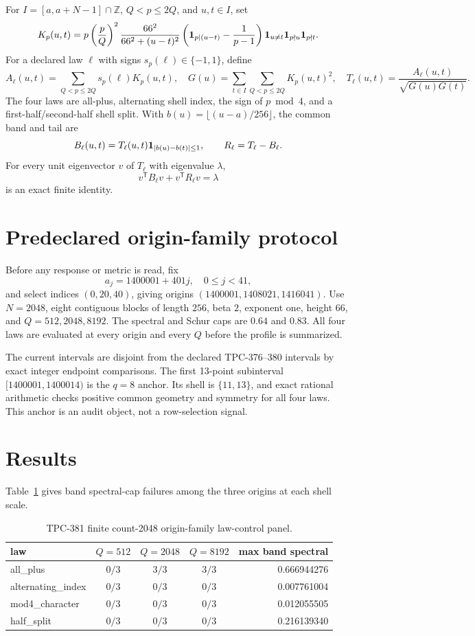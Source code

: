 \documentclass[10pt]{article}
\begin{document}
For $I=[a,a+N-1]\cap\mathbb Z$, $Q<p\leq2Q$, and $u,t\in I$, set
\[
 K_p(u,t)=p\left(\frac pQ\right)^2
 \frac{66^2}{66^2+(u-t)^2}
 \left({\bf1}_{p\mid(u-t)}-\frac1{p-1}\right)
 {\bf1}_{u\ne t}{\bf1}_{p\nmid u}{\bf1}_{p\nmid t}.
\]
For a declared law $\ell$ with signs $s_p(\ell)\in\{-1,1\}$, define
\[
 A_\ell(u,t)=\sum_{Q<p\leq2Q}s_p(\ell)K_p(u,t),\quad
 G(u)=\sum_{t\in I}\sum_{Q<p\leq2Q}K_p(u,t)^2,
 \quad T_\ell(u,t)=\frac{A_\ell(u,t)}{\sqrt{G(u)G(t)}}.
\]
The four laws are all-plus, alternating shell index, the sign of $p\bmod4$,
and a first-half/second-half shell split.  With
$b(u)=\lfloor(u-a)/256\rfloor$, the common band and tail are
\[
 B_\ell(u,t)=T_\ell(u,t){\bf1}_{|b(u)-b(t)|\leq1},\qquad
 R_\ell=T_\ell-B_\ell.
\]
For every unit eigenvector $v$ of $T_\ell$ with eigenvalue $\lambda$,
\[
 v^{\mathsf T}B_\ell v+v^{\mathsf T}R_\ell v=\lambda
\]
is an exact finite identity.

\section{Predeclared origin-family protocol}

Before any response or metric is read, fix
\[
 a_j=1400001+401j,\quad 0\leq j<41,
\]
and select indices $(0,20,40)$, giving origins
$(1400001,1408021,1416041)$.  Use $N=2048$, eight contiguous blocks of
length $256$, beta $2$, exponent one, height $66$, and $Q=512,2048,8192$.
The spectral and Schur caps are $0.64$ and $0.83$.  All four laws are
evaluated at every origin and every $Q$ before the profile is summarized.

The current intervals are disjoint from the declared TPC-376--380 intervals
by exact integer endpoint comparisons.  The first 13-point subinterval
$[1400001,1400014)$ is the $q=8$ anchor.  Its shell is $\{11,13\}$, and
exact rational arithmetic checks positive common geometry and symmetry for all
four laws.  This anchor is an audit object, not a row-selection signal.

\section{Results}

Table~\ref{tab:count} gives band spectral-cap failures among the three origins
at each shell scale.

\begin{table}[ht]
\centering
\caption{TPC-381 finite count-2048 origin-family law-control panel.}
\label{tab:count}
\scriptsize
\begin{tabular}{l c c c r}
\toprule
law & $Q=512$ & $Q=2048$ & $Q=8192$ & max band spectral\\
\midrule
all\_plus & $0/3$ & $3/3$ & $3/3$ & 0.666944276\\
alternating\_index & $0/3$ & $0/3$ & $0/3$ & 0.007761004\\
mod4\_character & $0/3$ & $0/3$ & $0/3$ & 0.012055505\\
half\_split & $0/3$ & $0/3$ & $0/3$ & 0.216139340\\
\bottomrule
\end{tabular}
\end{table}
\end{document}
